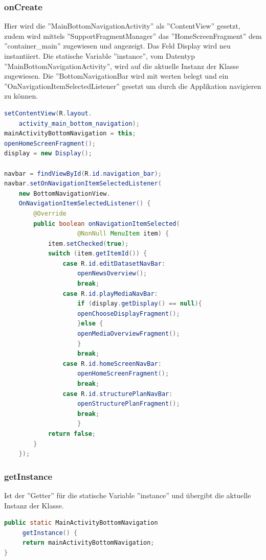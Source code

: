 \subsubsection{onCreate}
Hier wird die ''MainBottomNavigationActivity'' als ''ContentView'' gesetzt, zudem wird mittels ''SupportFragmentManager'' das ''HomeScreenFragment'' dem ''container\_main'' zugewiesen und angezeigt. Das Feld Display wird neu instantiiert. Die statische Variable ''instance'', vom Datentyp ''MainBottomNavigationActivity'', wird auf die aktuelle Instanz der Klasse zugewiesen. Die ''BottomNavigationBar wird mit werten belegt und ein ''OnNavigationItemSelectedListener'' gesetzt um durch die Applikation navigieren zu können.
\begin{lstlisting}[language=Java,caption={Zuweisung von Variablen und Navigationbar}]
setContentView(R.layout.
	activity_main_bottom_navigation);
mainActivityBottomNavigation = this;
openHomeScreenFragment();
display = new Display();
 
navbar = findViewById(R.id.navigation_bar);
navbar.setOnNavigationItemSelectedListener(
	new BottomNavigationView.
   	OnNavigationItemSelectedListener() {
    	@Override
     	public boolean onNavigationItemSelected(
     				@NonNull MenuItem item) {
     		item.setChecked(true);
        	switch (item.getItemId()) {
        		case R.id.editDatasetNavBar:
            		openNewsOverview();
                	break;
            	case R.id.playMediaNavBar:
                	if (display.getDisplay() == null){
                	openChooseDisplayFragment();
                	}else {
                	openMediaOverviewFragment();
                	}
                	break;
            	case R.id.homeScreenNavBar:
                	openHomeScreenFragment();
                	break;
            	case R.id.structurePlanNavBar:
                	openStructurePlanFragment();
                	break;
                	}
          	return false;
        }
	});
\end{lstlisting}	
\subsubsection{getInstance}
 Ist der ''Getter'' für die statische Variable ''instance'' und übergibt die aktuelle Instanz der Klasse.
\begin{lstlisting}[language=Java,caption={Getter für aktuelle Instanz der Activity}]
public static MainActivityBottomNavigation
	 getInstance() {
     return mainActivityBottomNavigation;
}
\end{lstlisting}
